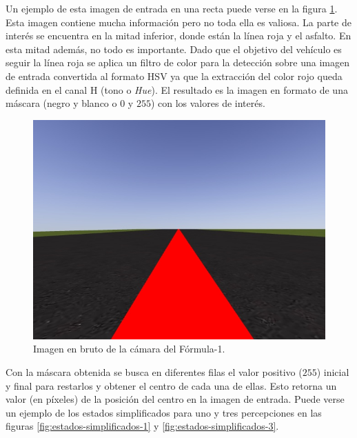 Un ejemplo de esta imagen de entrada en una recta puede verse en la figura \ref{fig:simple-image}. Esta imagen contiene mucha información pero no toda ella es valiosa. La parte de interés se encuentra en la mitad inferior, donde están la línea roja y el asfalto. En esta mitad además, no todo es importante. Dado que el objetivo del vehículo es seguir la línea roja se aplica un filtro de color para la detección sobre una imagen de entrada convertida al formato HSV ya que la extracción del color rojo queda definida en el canal H (tono o \textit{Hue}). El resultado es la imagen en formato de una máscara (negro y blanco o $0$ y $255$) con los valores de interés.\\

\begin{figure}[!ht]
    \centering \includegraphics[width=0.4\columnwidth]{./figures/chapter_4/recta.jpg}
    \caption{
        \label{fig:simple-image}
            Imagen en bruto de la cámara del Fórmula-1.
    }
\end{figure}

Con la máscara obtenida se busca en diferentes filas el valor positivo ($255$) inicial y final para restarlos y obtener el centro de cada una de ellas. Esto retorna un valor (en píxeles) de la posición del centro en la imagen de entrada. Puede verse un ejemplo  de los estados simplificados para uno y tres percepciones en las figuras \ref{fig:estados-simplificados-1} y \ref{fig:estados-simplificados-3}.\\


